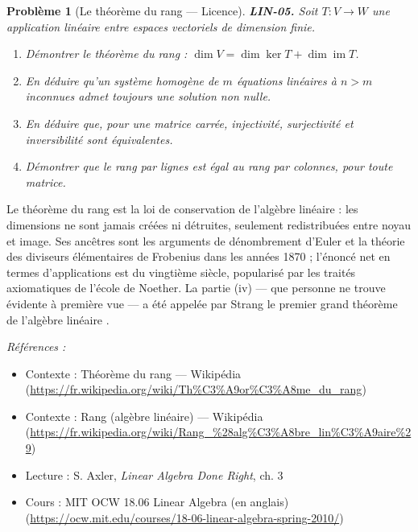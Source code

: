 \documentclass[11pt]{article}
\newtheorem{problem}{Problème}
\newenvironment{refs}{\par\small\noindent\emph{Références :}\begin{itemize}\setlength\itemsep{0pt}}{\end{itemize}\normalsize}
\begin{document}
\begin{problem}[{Le théorème du rang --- Licence}]
\textbf{LIN-05.} Soit $T : V \to W$ une application linéaire entre
espaces vectoriels de dimension finie.
\begin{enumerate}
\item[(i)] Démontrer le théorème du rang :
$\dim V = \dim \ker T + \dim \operatorname{im} T$.
\item[(ii)] En déduire qu'un système homogène de
$m$ équations linéaires à $n > m$ inconnues admet toujours une solution non nulle.
\item[(iii)] En déduire
que, pour une matrice carrée, injectivité, surjectivité et inversibilité sont équivalentes.
\item[(iv)] Démontrer que le rang par lignes est égal au rang par colonnes, pour toute matrice.
\end{enumerate}

\end{problem}

\noindent Le théorème du rang est la loi de conservation de l'algèbre linéaire : les
dimensions ne sont jamais créées ni détruites, seulement redistribuées entre noyau et image. Ses
ancêtres sont les arguments de dénombrement d'Euler et la théorie des \og{} diviseurs élémentaires \fg{} de
Frobenius dans les années 1870 ; l'énoncé net en termes d'applications est du vingtième siècle,
popularisé par les traités axiomatiques de l'école de Noether. La partie (iv) --- que personne ne
trouve évidente à première vue --- a été appelée par Strang \og{} le premier grand théorème de l'algèbre
linéaire \fg{}.

\begin{refs}
\item Contexte : Théorème du rang --- Wikipédia (\url{https://fr.wikipedia.org/wiki/Th%C3%A9or%C3%A8me_du_rang})
\item Contexte : Rang (algèbre linéaire) --- Wikipédia (\url{https://fr.wikipedia.org/wiki/Rang_%28alg%C3%A8bre_lin%C3%A9aire%29})
\item Lecture : S. Axler, \textit{Linear Algebra Done Right}, ch. 3
\item Cours : MIT OCW 18.06 Linear Algebra (en anglais) (\url{https://ocw.mit.edu/courses/18-06-linear-algebra-spring-2010/})
\end{refs}

\bigskip
\end{document}
